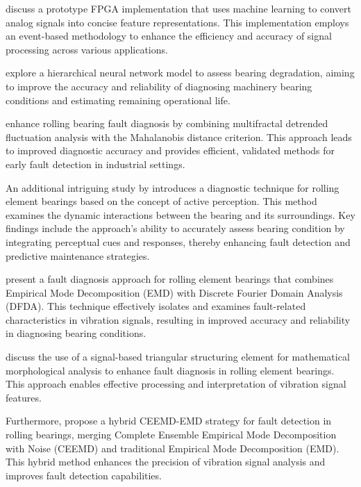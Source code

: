 \documentclass[sn-basic,pdflatex]{sn-jnl}
\theoremstyle{remark}
\theoremstyle{definition}
\begin{document}
\citet{WOS:000345844100102} discuss a prototype FPGA implementation that
uses machine learning to convert analog signals into concise feature
representations. This implementation employs an event-based methodology
to enhance the efficiency and accuracy of signal processing across
various applications.

\citet{WOS:000396580800080} explore a hierarchical neural network model
to assess bearing degradation, aiming to improve the accuracy and
reliability of diagnosing machinery bearing conditions and estimating
remaining operational life.

\citet{WOS:000320835800016} enhance rolling bearing fault diagnosis by
combining multifractal detrended fluctuation analysis with the
Mahalanobis distance criterion. This approach leads to improved
diagnostic accuracy and provides efficient, validated methods for early
fault detection in industrial settings.

An additional intriguing study by \citet{WOS:000360994300029} introduces
a diagnostic technique for rolling element bearings based on the concept
of active perception. This method examines the dynamic interactions
between the bearing and its surroundings. Key findings include the
approach's ability to accurately assess bearing condition by integrating
perceptual cues and responses, thereby enhancing fault detection and
predictive maintenance strategies.

\citet{WOS:000343577703075} present a fault diagnosis approach for
rolling element bearings that combines Empirical Mode Decomposition
(EMD) with Discrete Fourier Domain Analysis (DFDA). This technique
effectively isolates and examines fault-related characteristics in
vibration signals, resulting in improved accuracy and reliability in
diagnosing bearing conditions.

\citet{WOS:000334316700001} discuss the use of a signal-based triangular
structuring element for mathematical morphological analysis to enhance
fault diagnosis in rolling element bearings. This approach enables
effective processing and interpretation of vibration signal features.

Furthermore, \citet{WOS:000412752200052} propose a hybrid CEEMD-EMD
strategy for fault detection in rolling bearings, merging Complete
Ensemble Empirical Mode Decomposition with Noise (CEEMD) and traditional
Empirical Mode Decomposition (EMD). This hybrid method enhances the
precision of vibration signal analysis and improves fault detection
capabilities.
\end{document}
